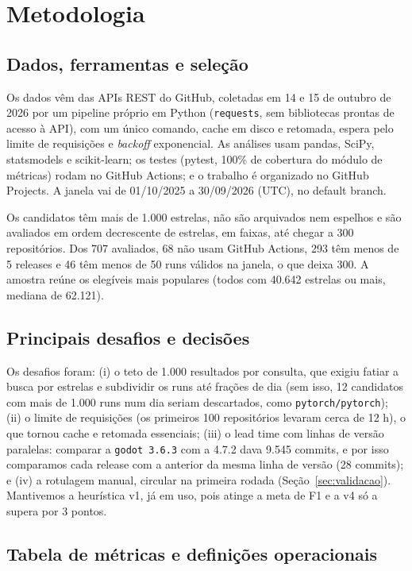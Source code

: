 \documentclass[12pt]{article}
\begin{document}
\section{Metodologia}
\label{sec:metodologia}

\subsection{Dados, ferramentas e seleção}

Os dados vêm das APIs REST do GitHub, coletadas em 14 e 15 de outubro de 2026 por um pipeline próprio em Python (\texttt{requests}, sem bibliotecas prontas de acesso à API), com um único comando, cache em disco e retomada, espera pelo limite de requisições e \emph{backoff} exponencial. As análises usam pandas, SciPy, statsmodels e scikit-learn; os testes (pytest, 100\% de cobertura do módulo de métricas) rodam no GitHub Actions; e o trabalho é organizado no GitHub Projects. A janela vai de 01/10/2025 a 30/09/2026 (UTC), no default branch.

Os candidatos têm mais de 1.000 estrelas, não são arquivados nem espelhos e são avaliados em ordem decrescente de estrelas, em faixas, até chegar a 300 repositórios. Dos 707 avaliados, 68 não usam GitHub Actions, 293 têm menos de 5 releases e 46 têm menos de 50 runs válidos na janela, o que deixa 300. A amostra reúne os elegíveis mais populares (todos com 40.642 estrelas ou mais, mediana de 62.121).

\subsection{Principais desafios e decisões}

Os desafios foram: (i) o teto de 1.000 resultados por consulta, que exigiu fatiar a busca por estrelas e subdividir os runs até frações de dia (sem isso, 12 candidatos com mais de 1.000 runs num dia seriam descartados, como \texttt{pytorch/pytorch}); (ii) o limite de requisições (os primeiros 100 repositórios levaram cerca de 12 h), o que tornou cache e retomada essenciais; (iii) o lead time com linhas de versão paralelas: comparar a \texttt{godot 3.6.3} com a 4.7.2 dava 9.545 commits, e por isso comparamos cada release com a anterior da mesma linha de versão (28 commits); e (iv) a rotulagem manual, circular na primeira rodada (Seção~\ref{sec:validacao}). Mantivemos a heurística v1, já em uso, pois atinge a meta de F1 e a v4 só a supera por 3 pontos.

\subsection{Tabela de métricas e definições operacionais}
\label{sec:definicoes}
\end{document}
